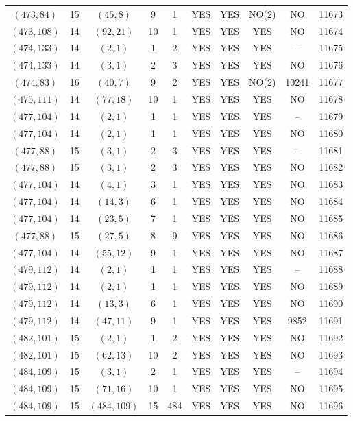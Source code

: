 \begin{longtable}{|c|c|c|c|c|c|c|c|c|c|}
$(473, 84)$ & 15 & $(45, 8)$ & 9 & 1 & YES & YES & NO(2) & NO & 11673\\
$(473, 108)$ & 14 & $(92, 21)$ & 10 & 1 & YES & YES & YES & NO & 11674\\
$(474, 133)$ & 14 & $(2, 1)$ & 1 & 2 & YES & YES & YES & -- & 11675\\
$(474, 133)$ & 14 & $(3, 1)$ & 2 & 3 & YES & YES & YES & NO & 11676\\
$(474, 83)$ & 16 & $(40, 7)$ & 9 & 2 & YES & YES & NO(2) & 10241 & 11677\\
$(475, 111)$ & 14 & $(77, 18)$ & 10 & 1 & YES & YES & YES & NO & 11678\\
$(477, 104)$ & 14 & $(2, 1)$ & 1 & 1 & YES & YES & YES & -- & 11679\\
$(477, 104)$ & 14 & $(2, 1)$ & 1 & 1 & YES & YES & YES & NO & 11680\\
$(477, 88)$ & 15 & $(3, 1)$ & 2 & 3 & YES & YES & YES & -- & 11681\\
$(477, 88)$ & 15 & $(3, 1)$ & 2 & 3 & YES & YES & YES & NO & 11682\\
$(477, 104)$ & 14 & $(4, 1)$ & 3 & 1 & YES & YES & YES & NO & 11683\\
$(477, 104)$ & 14 & $(14, 3)$ & 6 & 1 & YES & YES & YES & NO & 11684\\
$(477, 104)$ & 14 & $(23, 5)$ & 7 & 1 & YES & YES & YES & NO & 11685\\
$(477, 88)$ & 15 & $(27, 5)$ & 8 & 9 & YES & YES & YES & NO & 11686\\
$(477, 104)$ & 14 & $(55, 12)$ & 9 & 1 & YES & YES & YES & NO & 11687\\
$(479, 112)$ & 14 & $(2, 1)$ & 1 & 1 & YES & YES & YES & -- & 11688\\
$(479, 112)$ & 14 & $(2, 1)$ & 1 & 1 & YES & YES & YES & NO & 11689\\
$(479, 112)$ & 14 & $(13, 3)$ & 6 & 1 & YES & YES & YES & NO & 11690\\
$(479, 112)$ & 14 & $(47, 11)$ & 9 & 1 & YES & YES & YES & 9852 & 11691\\
$(482, 101)$ & 15 & $(2, 1)$ & 1 & 2 & YES & YES & YES & NO & 11692\\
$(482, 101)$ & 15 & $(62, 13)$ & 10 & 2 & YES & YES & YES & NO & 11693\\
$(484, 109)$ & 15 & $(3, 1)$ & 2 & 1 & YES & YES & YES & -- & 11694\\
$(484, 109)$ & 15 & $(71, 16)$ & 10 & 1 & YES & YES & YES & NO & 11695\\
$(484, 109)$ & 15 & $(484, 109)$ & 15 & 484 & YES & YES & YES & NO & 11696\\

\end{longtable}
